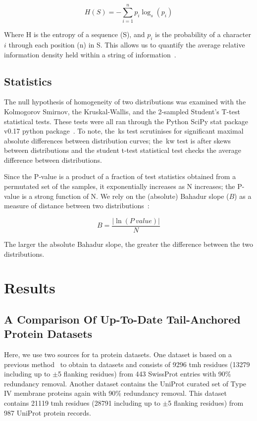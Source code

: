\begin{equation} \label{simpleentropy2}
	H(S)=-{\sum_{i=1}^n {p_i\log_s(p_i)}}
\end{equation}

Where H is the entropy of a sequence (S), and $p_i$ is the probability of a character $i$ through each position (n) in S. This allows us to quantify the average relative information density held within a string of information~\cite{Shannon1948}.

\subsection{Statistics}

The null hypothesis of homogeneity of two distributions was examined with the Kolmogorov Smirnov, the Kruskal-Wallis, and the 2-sampled Student's T-test statistical tests.
These tests were all ran through the Python SciPy stat package v0.17 python package~\cite{VanderWalt2011}.
To note, the~\gls{ks} test scrutinises for significant maximal absolute differences between distribution curves; the~\gls{kw} test is after skews between distributions and the student t-test statistical test checks the average difference between distributions.

Since the P‑value is a product of a fraction of test statistics obtained from a permutated set of the samples, it exponentially increases as N increases; the P-value is a strong function of N.
We rely on the (absolute) Bahadur slope ($B$) as a measure of distance between two distributions~\cite{Bahadur1967, Bahadur1971, Sunyaev1998, Baker2017}:

\begin{equation} \label{eq:bahadur2}
B=\frac{|\ln(P~value)|}{N}
\end{equation}

The larger the absolute Bahadur slope, the greater the difference between the two distributions.


\section{Results}

\subsection{A Comparison Of Up-To-Date Tail-Anchored Protein Datasets}
Here, we use two sources for \gls{ta} protein datasets.
One dataset is based on a previous method~\cite{Kalbfleisch2007} to obtain \gls{ta} datasets and consists of 9296 \gls{tmh} residues (13279 including up to $\pm$5 flanking residues) from 443 SwissProt entries with 90\% redundancy removal.
Another dataset contains the UniProt curated set of Type IV membrane proteins again with 90\% redundancy removal.
This dataset contains 21119 \gls{tmh} residues (28791 including up to $\pm$5 flanking residues) from 987 UniProt protein records.

